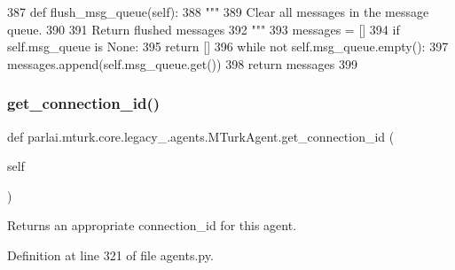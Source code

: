 \begin{DoxyCode}
387     \textcolor{keyword}{def }flush\_msg\_queue(self):
388         \textcolor{stringliteral}{"""}
389 \textcolor{stringliteral}{        Clear all messages in the message queue.}
390 \textcolor{stringliteral}{}
391 \textcolor{stringliteral}{        Return flushed messages}
392 \textcolor{stringliteral}{        """}
393         messages = []
394         \textcolor{keywordflow}{if} self.msg\_queue \textcolor{keywordflow}{is} \textcolor{keywordtype}{None}:
395             \textcolor{keywordflow}{return} []
396         \textcolor{keywordflow}{while} \textcolor{keywordflow}{not} self.msg\_queue.empty():
397             messages.append(self.msg\_queue.get())
398         \textcolor{keywordflow}{return} messages
399 
\end{DoxyCode}
\mbox{\label{classparlai_1_1mturk_1_1core_1_1legacy__2018_1_1agents_1_1MTurkAgent_ac8a29e82cef967de9646252059c6658b}} 
\subsubsection{\texorpdfstring{get\+\_\+connection\+\_\+id()}{get\_connection\_id()}}
{\footnotesize\ttfamily def parlai.\+mturk.\+core.\+legacy\+\_.\+agents.\+M\+Turk\+Agent.\+get\+\_\+connection\+\_\+id (\begin{DoxyParamCaption}\item[{}]{self }\end{DoxyParamCaption})}

\begin{DoxyVerb}Returns an appropriate connection_id for this agent.
\end{DoxyVerb}
 

Definition at line 321 of file agents.\+py.


